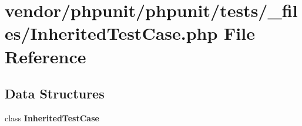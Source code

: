 \section{vendor/phpunit/phpunit/tests/\+\_\+files/\+Inherited\+Test\+Case.php File Reference}
\label{_inherited_test_case_8php}
\subsection*{Data Structures}
\begin{DoxyCompactItemize}
\item 
class {\bf Inherited\+Test\+Case}
\end{DoxyCompactItemize}
